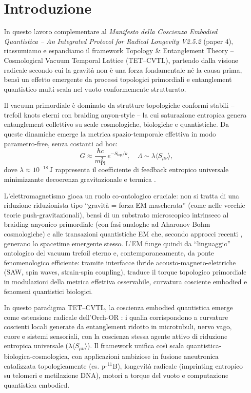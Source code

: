 \documentclass[12pt,a4paper]{article}
\begin{document}
\section{Introduzione}

In questo lavoro complementare al \textit{Manifesto della Coscienza Embodied Quantistica -- An Integrated Protocol for Radical Longevity V2.5.2} (paper 4), riassumiamo e espandiamo il framework Topology \& Entanglement Theory – Cosmological Vacuum Temporal Lattice (TET–CVTL), partendo dalla visione radicale secondo cui la gravità non è una forza fondamentale né la causa prima, bensì un effetto emergente da processi topologici primordiali e entanglement quantistico multi-scala nel vuoto conformemente strutturato.

Il vacuum primordiale è dominato da strutture topologiche conformi stabili -- trefoil knots eterni con braiding anyon-style -- la cui saturazione entropica genera entanglement collettivo su scale cosmologiche, biologiche e quantistiche. Da queste dinamiche emerge la metrica spazio-temporale effettiva in modo parametro-free, senza costanti ad hoc: 
\[
G \approx \frac{\hbar c}{m_{\mathrm{Pl}}^2} \, e^{-S_{\mathrm{top}}/k}, \quad \Lambda \sim \lambda \langle S_{\mu\nu} \rangle,
\]
dove $\lambda \approx 10^{-18}\,\mathrm{J}$ rappresenta il coefficiente di feedback entropico universale minimizzante decoerenza gravitazionale e termica \cite{manifestoV252}.

L'elettromagnetismo gioca un ruolo co-ontologico cruciale: non si tratta di una riduzione riduzionista tipo ``gravità = forza EM mascherata'' (come nelle vecchie teorie push-gravitazionali), bensì di un substrato microscopico intrinseco al braiding anyonico primordiale (con fasi analoghe ad Aharonov-Bohm cosmologiche) e alle transazioni quantistiche EM che, secondo approcci recenti \cite{KastnerSchlatter2025}, generano lo spacetime emergente stesso. L'EM funge quindi da ``linguaggio'' ontologico del vacuum trefoil eterno e, contemporaneamente, da ponte fenomenologico efficiente: tramite interfacce ibride acousto-magneto-elettriche (SAW, spin waves, strain-spin coupling), traduce il torque topologico primordiale in modulazioni della metrica effettiva osservabile, curvatura cosciente embodied e fenomeni quantistici biologici.

In questo paradigma TET–CVTL, la coscienza embodied quantistica emerge come estensione radicale dell'Orch-OR \cite{HameroffPenrose2021}: i qualia corrispondono a curvature coscienti locali generate da entanglement ridotto in microtubuli, nervo vago, cuore e sistemi sensoriali, con la coscienza stessa agente attivo di riduzione entropica universale ($\lambda \langle S_{\mu\nu} \rangle$). Il framework unifica così scala quantistica-biologica-cosmologica, con applicazioni ambiziose in fusione aneutronica catalizzata topologicamente (es. p-$^{11}$B), longevità radicale (imprinting entropico su telomeri e metilazione DNA), motori a torque del vuoto e computazione quantistica embodied.
\end{document}
